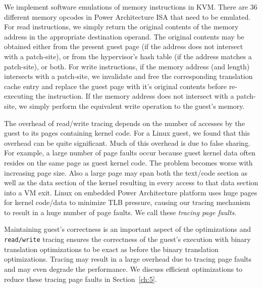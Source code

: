 We implement software emulations of memory instructions in KVM. There are 36 different memory opcodes in Power Architecture ISA that need to be emulated. For read instructions, we simply return the original contents of the memory address in the appropriate destination operand. The original contents may be obtained either from the present guest page (if the address does not intersect with a patch-site), or from the hypervisor's hash table (if the address matches a patch-site), or both. For write instructions, if the memory address (and length) intersects with a patch-site, we invalidate and free the corresponding translation cache entry and replace the guest page with it's original contents before re-executing the instruction. If the memory address does not intersect with a patch-site, we simply perform the equivalent write operation to the guest's memory. 

The overhead of read/write tracing depends on the number of accesses by the guest to its pages containing kernel code. For a Linux guest, we found that this overhead can be quite significant. Much of this overhead is due to false sharing. For example, a large number of page faults occur because guest kernel data often resides on the same page as guest kernel code. The problem becomes worse with increasing page size. Also a large page may span both the text/code section as well as the data section of the kernel resulting in every access to that data section into a VM exit. Linux on embedded Power Architecture platform uses huge pages for kernel code/data to minimize TLB pressure, causing our tracing mechanism to result in a huge number of page faults. We call these {\em tracing page faults}. 

Maintaining guest's correctness is an important aspect of the optimizations and {\tt read/write} tracing ensures the correctness of the guest's execution with binary translation optimizations to be exact as before the binary translation optimizations. Tracing may result in a large overhead due to tracing page faults and may even degrade the performance. We discuss efficient optimizations to reduce these tracing page faults in Section~\ref{ch:5}.


